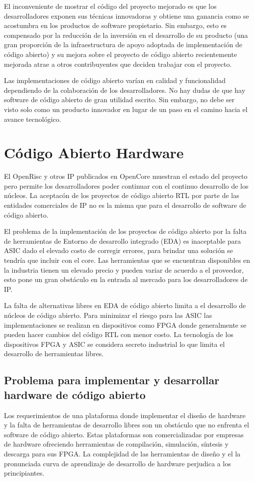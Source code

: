 	El inconveniente de mostrar el código del proyecto mejorado es que los desarrolladores exponen sus técnicas innovadoras y obtiene una ganancia como
	se acostumbra en los productos de software propietario. Sin embargo, esto es compensado por la reducción de la inversión en el desarrollo de su
	producto (una gran proporción de la infraestructura de apoyo adoptada de implementación de código abierto) y su mejora sobre el proyecto de código
	abierto recientemente mejorada atrae a otros contribuyentes que deciden trabajar con el proyecto.

	Las implementaciones de código abierto varían en calidad y funcionalidad dependiendo de la colaboración de los desarrolladores. No hay dudas de que
	hay software de código abierto de gran utilidad escrito. Sin embargo, no debe ser visto solo como un producto innovador en lugar de un paso en el
	camino hacia el avance tecnológico.

\section {Código Abierto Hardware}
El OpenRisc y otros IP  publicados en OpenCore muestran el estado del proyecto pero permite los desarrolladores poder continuar con el continuo desarrollo de los núcleos. La aceptacón de los proyectos de código abierto RTL por parte de las entidades comerciales de IP no es la misma que para el desarrollo de software de código abierto.

El problema de la implementación de los proyectos de código abierto por la falta de herramientas de Entorno de desarrollo integrado (EDA)  es inaceptable para ASIC dado el elevado costo de corregir errores, para brindar una solución se tendría que incluir con el core. Las herramientas  que se encuentran disponibles en la industria tienen un elevado precio y pueden variar de acuerdo a el proveedor, esto pone un gran obstáculo en la entrada al mercado para los desarrolladores de IP.

La falta de alternativas libres en EDA de código abierto limita a el desarrollo de núcleos de código abierto. Para minimizar el riesgo para las ASIC las implementaciones se realizan en dispositivos como FPGA donde generalmente se pueden hacer cambios del código RTL con menor costo. La tecnología de los dispositivos FPGA y ASIC se considera secreto industrial
lo que limita el desarrollo de herramientas libres.
	\subsection{Problema para implementar y desarrollar hardware de código abierto }
Los requerimientos de una plataforma donde implementar el diseño de hardware y la falta de herramientas de desarrollo libres son un obstáculo que no enfrenta el software de código abierto. Estas plataformas son comercializadas por empresas de hardware ofreciendo herramientas de  compilación, simulación, síntesis y descarga para sus FPGA. La complejidad de las herramientas de diseño y el la pronunciada curva de aprendizaje de desarrollo de hardware perjudica a los principiantes. 

